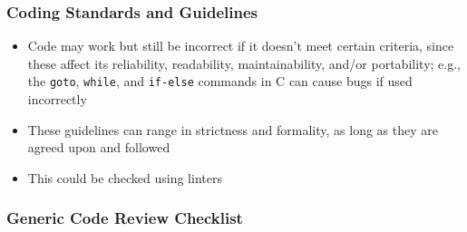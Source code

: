 \subsubsection{Coding Standards and Guidelines \cite[pp.~96-99]{patton_software_2006}}

\begin{itemize}
      \item Code may work but still be incorrect if it doesn't meet certain
            criteria, since these affect its reliability, readability,
            maintainability, and/or portability; e.g., the \texttt{goto},
            \texttt{while}, and \texttt{if-else} commands in C can cause bugs
            if used incorrectly \cite[p.~96]{patton_software_2006}
      \item These guidelines can range in strictness and formality, as long as
            they are agreed upon and followed \cite[p.~96]{patton_software_2006}
      \item This could be checked using linters
\end{itemize}

\subsubsection{Generic Code Review Checklist \cite[pp.~99-103]{patton_software_2006}}
\label{gen-code-review-checklist}

